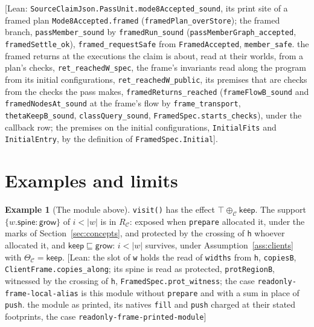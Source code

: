 \documentclass[10pt,a4paper]{article}
\theoremstyle{definition}
\newtheorem{example}[theorem]{Example}
\theoremstyle{remark}
\newcommand{\kw}[1]{\mathsf{#1}}
\newcommand{\keep}{\kw{keep}}
\newcommand{\grow}{\kw{grow}}
\newcommand{\len}[1]{|#1|}
\newcommand{\code}[1]{\texttt{#1}}
\newcommand{\lean}[1]{\texttt{\small #1}}
\newcommand{\status}[1]{\textsf{\small[#1]}}
\newcommand{\cC}{\mathcal{C}}
\begin{document}
\begin{description}[leftmargin=1.5em,style=nextline]
\status{Lean: \lean{SourceClaimJson.PassUnit.mode8Accepted\_sound}, its print site of a framed plan \lean{Mode8Accepted.framed} (\lean{framedPlan\_overStore}); the framed branch, \lean{passMember\_sound} by \lean{framedRun\_sound} (\lean{passMemberGraph\_accepted}, \lean{framedSettle\_ok}), \lean{framed\_requestSafe} from \lean{FramedAccepted}, \lean{member\_safe}. the framed returns at the executions the claim is about, read at their worlds, from a plan's checks, \lean{ret\_reachedW\_spec}, the frame's invariants read along the program from its initial configurations, \lean{ret\_reachedW\_public}, its premises that are checks from the checks the pass makes, \lean{framedReturns\_reached} (\lean{frameFlowB\_sound} and \lean{framedNodesAt\_sound} at the frame's flow by \lean{frame\_transport}, \lean{thetaKeepB\_sound}, \lean{classQuery\_sound}, \lean{FramedSpec.starts\_checks}), under the callback row; the premises on the initial configurations, \lean{InitialFits} and \lean{InitialEntry}, by the definition of \lean{FramedSpec.Initial}}.
\end{description}

\fussy
\section{Examples and limits}\label{sec:examples}

\begin{example}[The module above]\label{ex:ro}
\code{visit()} has the effect $\top\oplus_\cC\keep$. The support
$\{w.\kw{spine}:\grow\}$ of $i<\len w$ is in $R_\cC$: exposed when
\code{prepare} allocated it, under the marks of Section~\ref{sec:concepts},
and protected by the crossing of \code{h} whoever allocated it, and $\keep\sqsubseteq\grow$: $i<\len w$ survives,
under Assumption~\ref{ass:clients} with $\Theta_\cC=\keep$.
\status{Lean: the slot of \code{w} holds the read of \code{widths} from \code{h}, \lean{copiesB}, \lean{ClientFrame.copies\_along}; its spine is read as protected, \lean{protRegionB}, witnessed by the crossing of \code{h}, \lean{FramedSpec.prot\_witness}; the case \code{readonly-frame-local-alias} is this module without \code{prepare} and with a sum in place of \code{push}. the module as printed, its natives \code{fill} and \code{push} charged at their stated footprints, the case \code{readonly-frame-printed-module}}
\end{example}
\end{document}
